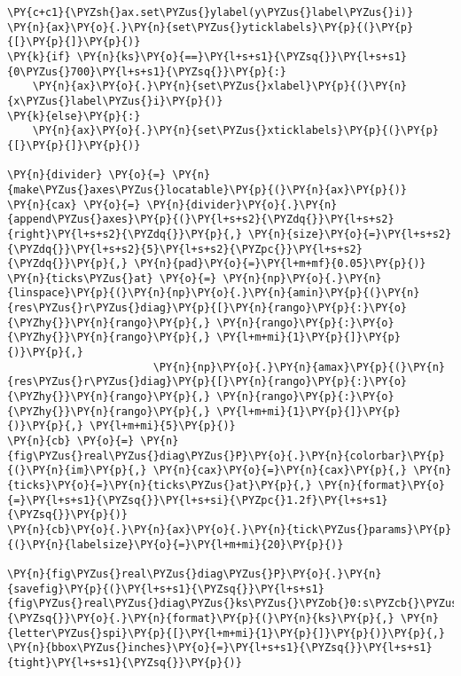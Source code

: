 \begin{Verbatim}[commandchars=\\\{\}]
\PY{c+c1}{\PYZsh{}ax.set\PYZus{}ylabel(y\PYZus{}label\PYZus{}i)}
\PY{n}{ax}\PY{o}{.}\PY{n}{set\PYZus{}yticklabels}\PY{p}{(}\PY{p}{[}\PY{p}{]}\PY{p}{)}
\PY{k}{if} \PY{n}{ks}\PY{o}{==}\PY{l+s+s1}{\PYZsq{}}\PY{l+s+s1}{0\PYZus{}700}\PY{l+s+s1}{\PYZsq{}}\PY{p}{:}
    \PY{n}{ax}\PY{o}{.}\PY{n}{set\PYZus{}xlabel}\PY{p}{(}\PY{n}{x\PYZus{}label\PYZus{}i}\PY{p}{)}
\PY{k}{else}\PY{p}{:}
    \PY{n}{ax}\PY{o}{.}\PY{n}{set\PYZus{}xticklabels}\PY{p}{(}\PY{p}{[}\PY{p}{]}\PY{p}{)}

\PY{n}{divider} \PY{o}{=} \PY{n}{make\PYZus{}axes\PYZus{}locatable}\PY{p}{(}\PY{n}{ax}\PY{p}{)}
\PY{n}{cax} \PY{o}{=} \PY{n}{divider}\PY{o}{.}\PY{n}{append\PYZus{}axes}\PY{p}{(}\PY{l+s+s2}{\PYZdq{}}\PY{l+s+s2}{right}\PY{l+s+s2}{\PYZdq{}}\PY{p}{,} \PY{n}{size}\PY{o}{=}\PY{l+s+s2}{\PYZdq{}}\PY{l+s+s2}{5}\PY{l+s+s2}{\PYZpc{}}\PY{l+s+s2}{\PYZdq{}}\PY{p}{,} \PY{n}{pad}\PY{o}{=}\PY{l+m+mf}{0.05}\PY{p}{)}
\PY{n}{ticks\PYZus{}at} \PY{o}{=} \PY{n}{np}\PY{o}{.}\PY{n}{linspace}\PY{p}{(}\PY{n}{np}\PY{o}{.}\PY{n}{amin}\PY{p}{(}\PY{n}{res\PYZus{}r\PYZus{}diag}\PY{p}{[}\PY{n}{rango}\PY{p}{:}\PY{o}{\PYZhy{}}\PY{n}{rango}\PY{p}{,} \PY{n}{rango}\PY{p}{:}\PY{o}{\PYZhy{}}\PY{n}{rango}\PY{p}{,} \PY{l+m+mi}{1}\PY{p}{]}\PY{p}{)}\PY{p}{,}
                       \PY{n}{np}\PY{o}{.}\PY{n}{amax}\PY{p}{(}\PY{n}{res\PYZus{}r\PYZus{}diag}\PY{p}{[}\PY{n}{rango}\PY{p}{:}\PY{o}{\PYZhy{}}\PY{n}{rango}\PY{p}{,} \PY{n}{rango}\PY{p}{:}\PY{o}{\PYZhy{}}\PY{n}{rango}\PY{p}{,} \PY{l+m+mi}{1}\PY{p}{]}\PY{p}{)}\PY{p}{,} \PY{l+m+mi}{5}\PY{p}{)} 
\PY{n}{cb} \PY{o}{=} \PY{n}{fig\PYZus{}real\PYZus{}diag\PYZus{}P}\PY{o}{.}\PY{n}{colorbar}\PY{p}{(}\PY{n}{im}\PY{p}{,} \PY{n}{cax}\PY{o}{=}\PY{n}{cax}\PY{p}{,} \PY{n}{ticks}\PY{o}{=}\PY{n}{ticks\PYZus{}at}\PY{p}{,} \PY{n}{format}\PY{o}{=}\PY{l+s+s1}{\PYZsq{}}\PY{l+s+si}{\PYZpc{}1.2f}\PY{l+s+s1}{\PYZsq{}}\PY{p}{)}
\PY{n}{cb}\PY{o}{.}\PY{n}{ax}\PY{o}{.}\PY{n}{tick\PYZus{}params}\PY{p}{(}\PY{n}{labelsize}\PY{o}{=}\PY{l+m+mi}{20}\PY{p}{)}

\PY{n}{fig\PYZus{}real\PYZus{}diag\PYZus{}P}\PY{o}{.}\PY{n}{savefig}\PY{p}{(}\PY{l+s+s1}{\PYZsq{}}\PY{l+s+s1}{fig\PYZus{}real\PYZus{}diag\PYZus{}ks\PYZus{}\PYZob{}0:s\PYZcb{}\PYZus{}\PYZob{}1:s\PYZcb{}}\PY{l+s+s1}{\PYZsq{}}\PY{o}{.}\PY{n}{format}\PY{p}{(}\PY{n}{ks}\PY{p}{,} \PY{n}{letter\PYZus{}spi}\PY{p}{[}\PY{l+m+mi}{1}\PY{p}{]}\PY{p}{)}\PY{p}{,} \PY{n}{bbox\PYZus{}inches}\PY{o}{=}\PY{l+s+s1}{\PYZsq{}}\PY{l+s+s1}{tight}\PY{l+s+s1}{\PYZsq{}}\PY{p}{)}



\end{Verbatim}
